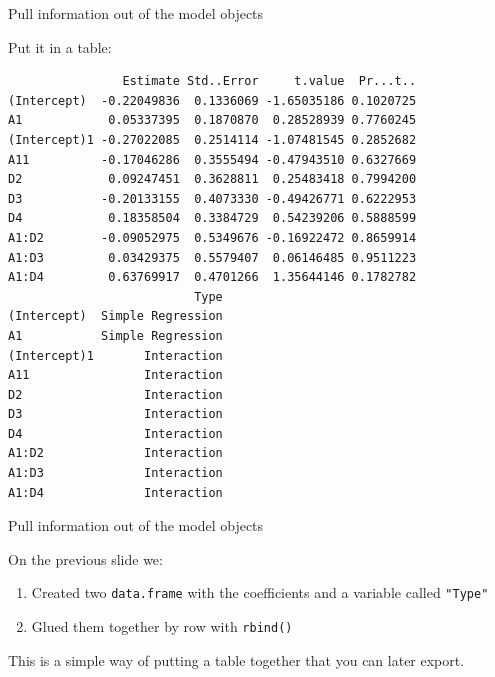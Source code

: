 \begin{frame}[fragile]{Pull information out of the model objects}

Put it in a table:

\begin{Shaded}
\begin{Highlighting}[]
\NormalTok{(}\NormalTok{(}\OperatorTok{$}\NormalTok{=}\NormalTok{),}
      \NormalTok{(}\OperatorTok{$}\NormalTok{=}\NormalTok{))}
\end{Highlighting}
\end{Shaded}

\begin{verbatim}
                Estimate Std..Error     t.value  Pr...t..
(Intercept)  -0.22049836  0.1336069 -1.65035186 0.1020725
A1            0.05337395  0.1870870  0.28528939 0.7760245
(Intercept)1 -0.27022085  0.2514114 -1.07481545 0.2852682
A11          -0.17046286  0.3555494 -0.47943510 0.6327669
D2            0.09247451  0.3628811  0.25483418 0.7994200
D3           -0.20133155  0.4073330 -0.49426771 0.6222953
D4            0.18358504  0.3384729  0.54239206 0.5888599
A1:D2        -0.09052975  0.5349676 -0.16922472 0.8659914
A1:D3         0.03429375  0.5579407  0.06146485 0.9511223
A1:D4         0.63769917  0.4701266  1.35644146 0.1782782
                          Type
(Intercept)  Simple Regression
A1           Simple Regression
(Intercept)1       Interaction
A11                Interaction
D2                 Interaction
D3                 Interaction
D4                 Interaction
A1:D2              Interaction
A1:D3              Interaction
A1:D4              Interaction
\end{verbatim}

\end{frame}

\begin{frame}[fragile]{Pull information out of the model objects}

\Large
On the previous slide we:

\begin{enumerate}
\def\labelenumi{\arabic{enumi}.}
\tightlist
\item
  Created two \texttt{data.frame} with the coefficients and a variable
  called \texttt{"Type"}
\item
  Glued them together by row with \texttt{rbind()}
\end{enumerate}

This is a simple way of putting a table together that you can later
export.

\end{frame}

